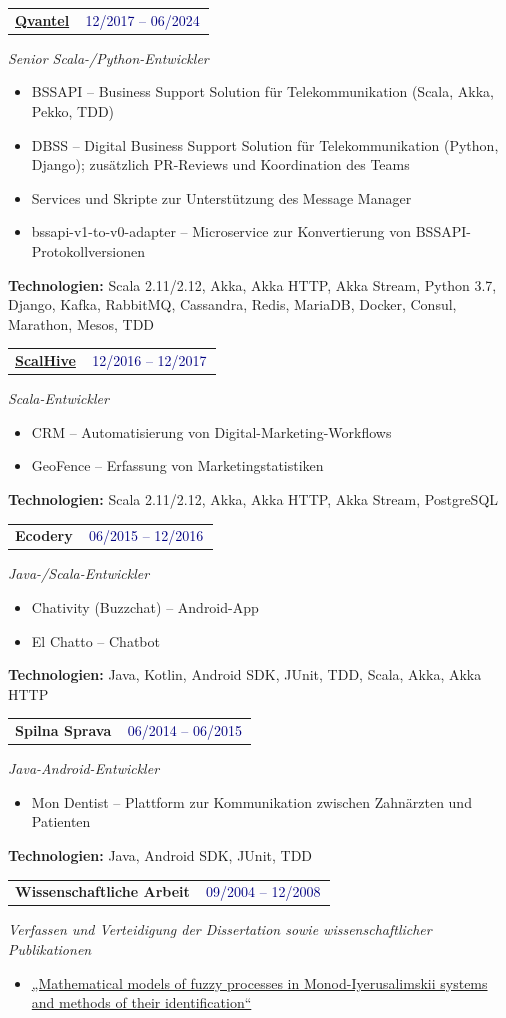 \documentclass[10pt,a4paper]{article}
\makeatletter
\newcommand{\entryrow}[2]{%
  \noindent\begin{tabularx}{\linewidth}{@{}X@{\hspace{8pt}}r@{}}
  \textbf{#1} & \colorbox{navyfaint}{\footnotesize\textcolor{navy}{\,#2\,}}\\
  \end{tabularx}%
}
\newcommand{\role}[1]{{\itshape\footnotesize\color{gray1}#1}\par\vspace{0.5pt}}
\newcommand{\techline}[1]{%
  {\setlength{\fboxsep}{2.2pt}%
  \vspace{1pt}\noindent
  \colorbox{gray2}{\parbox{\dimexpr\linewidth-2\fboxsep\relax}{\footnotesize\color{gray1}\textbf{Technologien: }#1}}}
  \vspace{1.5pt}\par
}
\makeatother
\begin{document}
\entryrow{\href{https://www.qvantel.com}{Qvantel}}{12/2017 -- 06/2024}
\role{Senior Scala-/Python-Entwickler}
\begin{itemize}
  \item BSSAPI -- Business Support Solution für Telekommunikation (Scala, Akka, Pekko, TDD)
  \item DBSS -- Digital Business Support Solution für Telekommunikation (Python, Django); zusätzlich PR-Reviews und Koordination des Teams
  \item Services und Skripte zur Unterstützung des Message Manager
  \item bssapi-v1-to-v0-adapter -- Microservice zur Konvertierung von BSSAPI-Protokollversionen
\end{itemize}
\techline{Scala 2.11/2.12, Akka, Akka HTTP, Akka Stream, Python 3.7, Django, Kafka, RabbitMQ, Cassandra, Redis, MariaDB, Docker, Consul, Marathon, Mesos, TDD}

\entryrow{\href{https://scalhive.com}{ScalHive}}{12/2016 -- 12/2017}
\role{Scala-Entwickler}
\begin{itemize}
  \item CRM -- Automatisierung von Digital-Marketing-Workflows
  \item GeoFence -- Erfassung von Marketingstatistiken
\end{itemize}
\techline{Scala 2.11/2.12, Akka, Akka HTTP, Akka Stream, PostgreSQL}

\entryrow{Ecodery}{06/2015 -- 12/2016}
\role{Java-/Scala-Entwickler}
\begin{itemize}
  \item Chativity (Buzzchat) -- Android-App
  \item El Chatto -- Chatbot
\end{itemize}
\techline{Java, Kotlin, Android SDK, JUnit, TDD, Scala, Akka, Akka HTTP}

\entryrow{Spilna Sprava}{06/2014 -- 06/2015}
\role{Java-Android-Entwickler}
\begin{itemize}
  \item Mon Dentist -- Plattform zur Kommunikation zwischen Zahnärzten und Patienten
\end{itemize}
\techline{Java, Android SDK, JUnit, TDD}

\entryrow{Wissenschaftliche Arbeit}{09/2004 -- 12/2008}
\role{Verfassen und Verteidigung der Dissertation sowie wissenschaftlicher Publikationen}
\begin{itemize}
  \item \href{https://ena.lpnu.ua/items/c882b7c6-b45d-4b1f-87ca-0a9938085e6c}{„Mathematical models of fuzzy processes in Monod-Iyerusalimskii systems and methods of their identification“}
\end{itemize}
\end{document}
